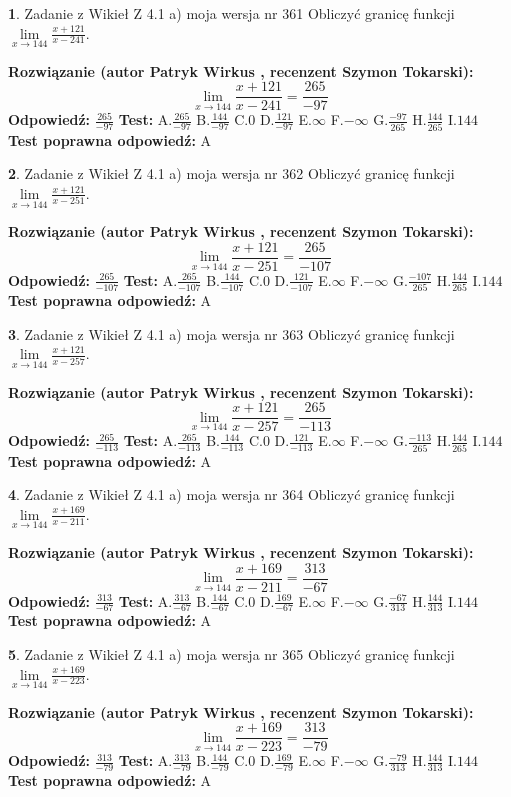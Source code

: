 \documentclass[12pt, a4paper]{article}
\theoremstyle{definition} %
\newtheorem{zad}{}
\newcommand{\zadStart}[1]{\begin{zad}#1\newline}
\newcommand{\zadStop}{\end{zad}}
\newcommand{\rozwStart}[2]{\noindent \textbf{Rozwiązanie (autor #1 , recenzent #2): }\newline}
\newcommand{\rozwStop}{\newline}
\newcommand{\odpStart}{\noindent \textbf{Odpowiedź:}\newline}
\newcommand{\odpStop}{\newline}
\newcommand{\testStart}{\noindent \textbf{Test:}\newline}
\newcommand{\testStop}{\newline}
\newcommand{\kluczStart}{\noindent \textbf{Test poprawna odpowiedź:}\newline}
\newcommand{\kluczStop}{\newline}
\begin{document}
\zadStart{Zadanie z Wikieł Z 4.1 a) moja wersja nr 361}
Obliczyć granicę funkcji $\lim\limits_{x\to144}\frac{x+121}{x-241}$.
\zadStop
\rozwStart{Patryk Wirkus}{Szymon Tokarski}
$$\lim\limits_{x\to144}\frac{x+121}{x-241} = \frac{265}{-97}$$
\rozwStop
\odpStart
$\frac{265}{-97}$
\odpStop
\testStart
A.$\frac{265}{-97}$
B.$\frac{144}{-97}$
C.$0$
D.$\frac{121}{-97}$
E.$\infty$
F.$-\infty$
G.$\frac{-97}{265}$
H.$\frac{144}{265}$
I.$144$
\testStop
\kluczStart
A
\kluczStop



\zadStart{Zadanie z Wikieł Z 4.1 a) moja wersja nr 362}
Obliczyć granicę funkcji $\lim\limits_{x\to144}\frac{x+121}{x-251}$.
\zadStop
\rozwStart{Patryk Wirkus}{Szymon Tokarski}
$$\lim\limits_{x\to144}\frac{x+121}{x-251} = \frac{265}{-107}$$
\rozwStop
\odpStart
$\frac{265}{-107}$
\odpStop
\testStart
A.$\frac{265}{-107}$
B.$\frac{144}{-107}$
C.$0$
D.$\frac{121}{-107}$
E.$\infty$
F.$-\infty$
G.$\frac{-107}{265}$
H.$\frac{144}{265}$
I.$144$
\testStop
\kluczStart
A
\kluczStop



\zadStart{Zadanie z Wikieł Z 4.1 a) moja wersja nr 363}
Obliczyć granicę funkcji $\lim\limits_{x\to144}\frac{x+121}{x-257}$.
\zadStop
\rozwStart{Patryk Wirkus}{Szymon Tokarski}
$$\lim\limits_{x\to144}\frac{x+121}{x-257} = \frac{265}{-113}$$
\rozwStop
\odpStart
$\frac{265}{-113}$
\odpStop
\testStart
A.$\frac{265}{-113}$
B.$\frac{144}{-113}$
C.$0$
D.$\frac{121}{-113}$
E.$\infty$
F.$-\infty$
G.$\frac{-113}{265}$
H.$\frac{144}{265}$
I.$144$
\testStop
\kluczStart
A
\kluczStop



\zadStart{Zadanie z Wikieł Z 4.1 a) moja wersja nr 364}
Obliczyć granicę funkcji $\lim\limits_{x\to144}\frac{x+169}{x-211}$.
\zadStop
\rozwStart{Patryk Wirkus}{Szymon Tokarski}
$$\lim\limits_{x\to144}\frac{x+169}{x-211} = \frac{313}{-67}$$
\rozwStop
\odpStart
$\frac{313}{-67}$
\odpStop
\testStart
A.$\frac{313}{-67}$
B.$\frac{144}{-67}$
C.$0$
D.$\frac{169}{-67}$
E.$\infty$
F.$-\infty$
G.$\frac{-67}{313}$
H.$\frac{144}{313}$
I.$144$
\testStop
\kluczStart
A
\kluczStop



\zadStart{Zadanie z Wikieł Z 4.1 a) moja wersja nr 365}
Obliczyć granicę funkcji $\lim\limits_{x\to144}\frac{x+169}{x-223}$.
\zadStop
\rozwStart{Patryk Wirkus}{Szymon Tokarski}
$$\lim\limits_{x\to144}\frac{x+169}{x-223} = \frac{313}{-79}$$
\rozwStop
\odpStart
$\frac{313}{-79}$
\odpStop
\testStart
A.$\frac{313}{-79}$
B.$\frac{144}{-79}$
C.$0$
D.$\frac{169}{-79}$
E.$\infty$
F.$-\infty$
G.$\frac{-79}{313}$
H.$\frac{144}{313}$
I.$144$
\testStop
\kluczStart
A
\kluczStop
\end{document}
